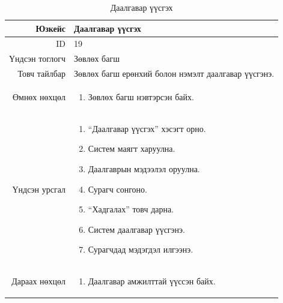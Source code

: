 \begin{longtable}{|r|p{11cm}|}
\caption{Даалгавар үүсгэх}
\label{table:usecase19}\\ \hline
Юзкейс & Даалгавар үүсгэх \\ \hline
ID & 19 \\ \hline
Үндсэн тоглогч & Зөвлөх багш \\ \hline
Товч тайлбар & Зөвлөх багш ерөнхий
болон нэмэлт даалгавар үүсгэнэ. \\ \hline
Өмнөх нөхцөл &
\begin{enumerate}[nosep]
\item Зөвлөх багш нэвтэрсэн байх.
\end{enumerate} \\ \hline
Үндсэн урсгал &
\begin{enumerate}[nosep]
\item ``Даалгавар үүсгэх'' хэсэгт орно.
\item Систем маягт харуулна.
\item Даалгаврын мэдээлэл оруулна.
\item Сурагч сонгоно.
\item ``Хадгалах'' товч дарна.
\item Систем даалгавар үүсгэнэ.
\item Сурагчдад мэдэгдэл илгээнэ.
\end{enumerate} \\ \hline
Дараах нөхцөл &
\begin{enumerate}[nosep]
\item Даалгавар амжилттай үүссэн байх.
\end{enumerate} \\ \hline
\end{longtable}

